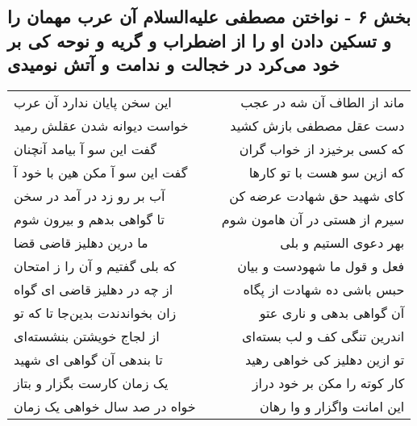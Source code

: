 \begin{center}
\section*{بخش ۶ - نواختن مصطفی علیه‌السلام آن عرب  مهمان را و تسکین دادن او را از اضطراب و گریه و نوحه کی بر خود می‌کرد در خجالت و ندامت و آتش نومیدی}
\label{sec:sh006}
\begin{longtable}{l p{0.5cm} r}
این سخن پایان ندارد آن عرب
&&
ماند از الطاف آن شه در عجب
\\
خواست دیوانه شدن عقلش رمید
&&
دست عقل مصطفی بازش کشید
\\
گفت این سو آ بیامد آنچنان
&&
که کسی برخیزد از خواب گران
\\
گفت این سو آ مکن هین با خود آ
&&
که ازین سو هست با تو کارها
\\
آب بر رو زد در آمد در سخن
&&
کای شهید حق شهادت عرضه کن
\\
تا گواهی بدهم و بیرون شوم
&&
سیرم از هستی در آن هامون شوم
\\
ما درین دهلیز قاضی قضا
&&
بهر دعوی الستیم و بلی
\\
که بلی گفتیم و آن را ز امتحان
&&
فعل و قول ما شهودست و بیان
\\
از چه در دهلیز قاضی ای گواه
&&
حبس باشی ده شهادت از پگاه
\\
زان بخواندندت بدین‌جا تا که تو
&&
آن گواهی بدهی و ناری عتو
\\
از لجاج خویشتن بنشسته‌ای
&&
اندرین تنگی کف و لب بسته‌ای
\\
تا بندهی آن گواهی ای شهید
&&
تو ازین دهلیز کی خواهی رهید
\\
یک زمان کارست بگزار و بتاز
&&
کار کوته را مکن بر خود دراز
\\
خواه در صد سال خواهی یک زمان
&&
این امانت واگزار و وا رهان
\\
\end{longtable}
\end{center}
